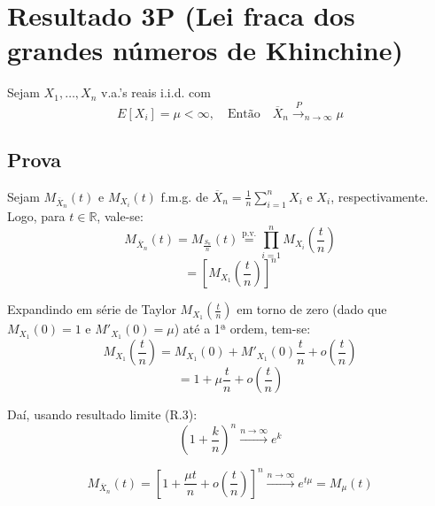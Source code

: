 \section*{Resultado 3P (Lei fraca dos grandes números de Khinchine)}

Sejam $X_1, \ldots, X_n$ v.a.'s reais i.i.d. com
\begin{equation}
    E[X_i] = \mu < \infty, \quad \text{Então} \quad \overline{X}_n \xrightarrow{P}_{n \to \infty} \mu
\end{equation}

\subsection*{Prova}
Sejam $M_{\overline{X}_n}(t)$ e $M_{X_i}(t)$ f.m.g. de $\overline{X}_n = \frac{1}{n} \sum_{i=1}^n X_i$ e $X_i$, respectivamente. Logo, para $t \in \mathbb{R}$, vale-se:
\begin{equation}
    M_{\overline{X}_n}(t) = M_{\frac{S_n}{n}}(t) \overset{\text{p.v.}}{=} \prod_{i=1}^n M_{X_i}\left(\frac{t}{n}\right)
\end{equation}
\begin{equation}
    = \left[ M_{X_1}\left(\frac{t}{n}\right) \right]^n \tag{3P.1}
\end{equation}

Expandindo em série de Taylor $M_{X_1}\left(\frac{t}{n}\right)$ em torno de zero (dado que $M_{X_1}(0) = 1$ e $M'_{X_1}(0) = \mu$) até a 1ª ordem, tem-se:
\begin{equation}
    M_{X_1}\left(\frac{t}{n}\right) = M_{X_1}(0) + M'_{X_1}(0) \frac{t}{n} + o\left(\frac{t}{n}\right)
\end{equation}
\begin{equation}
    = 1 + \mu \frac{t}{n} + o\left(\frac{t}{n}\right)
\end{equation}

Daí, usando resultado limite (R.3):
\begin{equation}
    \left(1 + \frac{k}{n}\right)^n \xrightarrow{n \to \infty} e^k
\end{equation}

\begin{equation}
    M_{\overline{X}_n}(t) = \left[ 1 + \frac{\mu t}{n} + o\left(\frac{t}{n}\right) \right]^n \xrightarrow{n \to \infty} e^{t\mu} = M_{\mu}(t)
\end{equation}